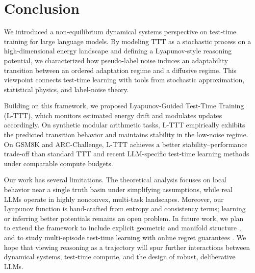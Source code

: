 \documentclass{article}
\theoremstyle{plain}
\theoremstyle{definition}
\theoremstyle{remark}
\begin{document}
\section{Conclusion}
We introduced a non-equilibrium dynamical systems perspective on test-time training for large language models. By modeling TTT as a stochastic process on a high-dimensional energy landscape and defining a Lyapunov-style reasoning potential, we characterized how pseudo-label noise induces an adaptability transition between an ordered adaptation regime and a diffusive regime. This viewpoint connects test-time learning with tools from stochastic approximation, statistical physics, and label-noise theory.

Building on this framework, we proposed Lyapunov-Guided Test-Time Training (L-TTT), which monitors estimated energy drift and modulates updates accordingly. On synthetic modular arithmetic tasks, L-TTT empirically exhibits the predicted transition behavior and maintains stability in the low-noise regime. On GSM8K and ARC-Challenge, L-TTT achieves a better stability--performance trade-off than standard TTT and recent LLM-specific test-time learning methods under comparable compute budgets.

Our work has several limitations. The theoretical analysis focuses on local behavior near a single truth basin under simplifying assumptions, while real LLMs operate in highly nonconvex, multi-task landscapes. Moreover, our Lyapunov function is hand-crafted from entropy and consistency terms; learning or inferring better potentials remains an open problem. In future work, we plan to extend the framework to include explicit geometric and manifold structure \cite{tenenbaum2000isomap,belkin2003laplacian,bronstein2021geomdl}, and to study multi-episode test-time learning with online regret guarantees \cite{shalev2011online,forestonline2019}. We hope that viewing reasoning as a trajectory will spur further interactions between dynamical systems, test-time compute, and the design of robust, deliberative LLMs.

\end{document}
